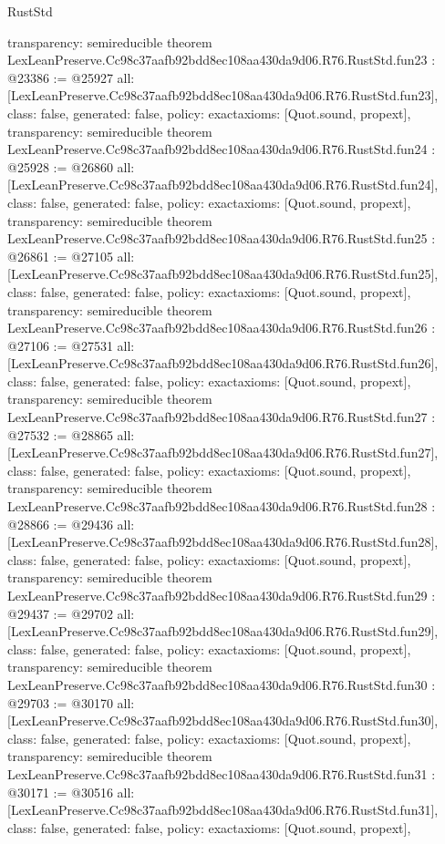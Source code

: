 \begin{lexlean}{RustStd}
\begin{coremodule}
{  transparency: semireducible
}
theorem LexLeanPreserve.Cc98c37aafb92bdd8ec108aa430da9d06.R76.RustStd.fun23 : @23386 := @25927 {
  all: [LexLeanPreserve.Cc98c37aafb92bdd8ec108aa430da9d06.R76.RustStd.fun23],
  class: false,
  generated: false,
  policy: exact{axioms: [Quot.sound, propext]},
  transparency: semireducible
}
theorem LexLeanPreserve.Cc98c37aafb92bdd8ec108aa430da9d06.R76.RustStd.fun24 : @25928 := @26860 {
  all: [LexLeanPreserve.Cc98c37aafb92bdd8ec108aa430da9d06.R76.RustStd.fun24],
  class: false,
  generated: false,
  policy: exact{axioms: [Quot.sound, propext]},
  transparency: semireducible
}
theorem LexLeanPreserve.Cc98c37aafb92bdd8ec108aa430da9d06.R76.RustStd.fun25 : @26861 := @27105 {
  all: [LexLeanPreserve.Cc98c37aafb92bdd8ec108aa430da9d06.R76.RustStd.fun25],
  class: false,
  generated: false,
  policy: exact{axioms: [Quot.sound, propext]},
  transparency: semireducible
}
theorem LexLeanPreserve.Cc98c37aafb92bdd8ec108aa430da9d06.R76.RustStd.fun26 : @27106 := @27531 {
  all: [LexLeanPreserve.Cc98c37aafb92bdd8ec108aa430da9d06.R76.RustStd.fun26],
  class: false,
  generated: false,
  policy: exact{axioms: [Quot.sound, propext]},
  transparency: semireducible
}
theorem LexLeanPreserve.Cc98c37aafb92bdd8ec108aa430da9d06.R76.RustStd.fun27 : @27532 := @28865 {
  all: [LexLeanPreserve.Cc98c37aafb92bdd8ec108aa430da9d06.R76.RustStd.fun27],
  class: false,
  generated: false,
  policy: exact{axioms: [Quot.sound, propext]},
  transparency: semireducible
}
theorem LexLeanPreserve.Cc98c37aafb92bdd8ec108aa430da9d06.R76.RustStd.fun28 : @28866 := @29436 {
  all: [LexLeanPreserve.Cc98c37aafb92bdd8ec108aa430da9d06.R76.RustStd.fun28],
  class: false,
  generated: false,
  policy: exact{axioms: [Quot.sound, propext]},
  transparency: semireducible
}
theorem LexLeanPreserve.Cc98c37aafb92bdd8ec108aa430da9d06.R76.RustStd.fun29 : @29437 := @29702 {
  all: [LexLeanPreserve.Cc98c37aafb92bdd8ec108aa430da9d06.R76.RustStd.fun29],
  class: false,
  generated: false,
  policy: exact{axioms: [Quot.sound, propext]},
  transparency: semireducible
}
theorem LexLeanPreserve.Cc98c37aafb92bdd8ec108aa430da9d06.R76.RustStd.fun30 : @29703 := @30170 {
  all: [LexLeanPreserve.Cc98c37aafb92bdd8ec108aa430da9d06.R76.RustStd.fun30],
  class: false,
  generated: false,
  policy: exact{axioms: [Quot.sound, propext]},
  transparency: semireducible
}
theorem LexLeanPreserve.Cc98c37aafb92bdd8ec108aa430da9d06.R76.RustStd.fun31 : @30171 := @30516 {
  all: [LexLeanPreserve.Cc98c37aafb92bdd8ec108aa430da9d06.R76.RustStd.fun31],
  class: false,
  generated: false,
  policy: exact{axioms: [Quot.sound, propext]},
}
\end{coremodule}
\end{lexlean}
